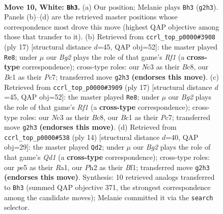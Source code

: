 \documentclass[11pt]{article}
\begin{document}
\clearpage

\begin{figure}[p]\centering
\begin{subfigure}{0.46\textwidth}\centering
\resizebox{\linewidth}{!}{%
\newchessgame
\chessboard[
  setfen={r1bq1rk1/1ppn1pb1/3p1np1/p2Pp2p/2P5/2N2NP1/PP2PPBP/R1BQ1R1K w - - 0 10},
  showmover=false,
  pgfstyle=straightmove, color=movearrow, markmove={g2-h3}
]}
\caption{}
\end{subfigure}\hfill
\begin{subfigure}{0.46\textwidth}\centering
\resizebox{\linewidth}{!}{%
\newchessgame
\chessboard[
  setfen={r1bq1rk1/2p1bppp/p1np1n2/1p2p3/4P3/2PP1N2/PPBN1PPP/R1BQ1RK1 b - - 1 9},
  showmover=false,
  pgfstyle=straightmove, color=movearrow, markmove={f8-e8}
]}
\caption{}
\end{subfigure}
\\[4pt]
\begin{subfigure}{0.46\textwidth}\centering
\resizebox{\linewidth}{!}{%
\newchessgame
\chessboard[
  setfen={r1bq1rk1/2p1bppp/p1np1n2/1p2p3/4P3/2PP1N2/PPBN1PPP/R1BQ1RK1 b - - 1 9},
  showmover=false,
  pgfstyle=straightmove, color=movearrow, markmove={f8-e8}
]}
\caption{}
\end{subfigure}\hfill
\begin{subfigure}{0.46\textwidth}\centering
\resizebox{\linewidth}{!}{%
\newchessgame
\chessboard[
  setfen={r1bq1rk1/pp1nppbp/2pp1np1/8/P2PP3/2N1BN1P/1PP2PP1/R2QKB1R w KQ - 1 8},
  showmover=false,
  pgfstyle=straightmove, color=movearrow, markmove={d1-d2}
]}
\caption{}
\end{subfigure}
\caption{\textbf{Move 10, White: \texttt{Bh3}.} (a) Our position; Melanie plays \texttt{Bh3} (\texttt{g2h3}). Panels (b)--(d) are the retrieved master positions whose correspondence most drove this move (highest QAP objective among those that transfer to it). (b) Retrieved from \texttt{ccrl\_top\_p0000\#3908} (ply 17) [structural distance $d$=45, QAP obj=52]: the master played \texttt{Re8}; under $\mu$ our \emph{Bg2} plays the role of that game's \emph{Rf1} (a \textbf{cross-type} correspondence); cross-type roles: our \emph{N}c3 as their \emph{B}c8, our \emph{B}c1 as their \emph{P}c7; transferred move \texttt{g2h3} \textbf{(endorses this move)}. (c) Retrieved from \texttt{ccrl\_top\_p0000\#3909} (ply 17) [structural distance $d$=45, QAP obj=52]: the master played \texttt{Re8}; under $\mu$ our \emph{Bg2} plays the role of that game's \emph{Rf1} (a \textbf{cross-type} correspondence); cross-type roles: our \emph{N}c3 as their \emph{B}c8, our \emph{B}c1 as their \emph{P}c7; transferred move \texttt{g2h3} \textbf{(endorses this move)}. (d) Retrieved from \texttt{ccrl\_top\_p0000\#538} (ply 14) [structural distance $d$=40, QAP obj=29]: the master played \texttt{Qd2}; under $\mu$ our \emph{Bg2} plays the role of that game's \emph{Qd1} (a \textbf{cross-type} correspondence); cross-type roles: our \emph{p}e5 as their \emph{R}a1, our \emph{P}h2 as their \emph{B}f1; transferred move \texttt{g2h3} \textbf{(endorses this move)}. Synthesis: 10 retrieved analogs transferred to \texttt{Bh3} (summed QAP objective 371, the strongest correspondence among the candidate moves); Melanie committed it via the \texttt{search} selector.}

\end{figure}
\end{document}
